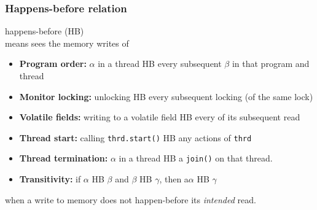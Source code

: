 \documentclass[aspectratio=169]{beamer}
\begin{document}
\begin{frame}\frametitle{Happens-before relation}
\centering

 \alert{happens-before (HB)} \\
means   sees the memory writes of 

\begin{itemize}
\item \textbf{Program order:} $\alpha$ in a thread \alert{HB} every subsequent $\beta$ in that program and thread
\item \textbf{Monitor locking:} unlocking \alert{HB} every subsequent locking (of the same lock)
\item \textbf{Volatile fields:} writing to a volatile field \alert{HB} every of its subsequent read
\item \textbf{Thread start:} calling \texttt{thrd.start()} \alert{HB} any actions of \texttt{thrd}
\item \textbf{Thread termination:} $\alpha$ in a thread \alert{HB} a \texttt{join()} on that thread.
\item \textbf{Transitivity:} if $\alpha$ \alert{HB} $\beta$ and $\beta$ \alert{HB} $\gamma$, then a$\alpha$ \alert{HB} $\gamma$
\end{itemize}

\pause
{} when a write to memory does not \alert{happen-before} its \emph{intended} read.
\end{frame}
\end{document}
